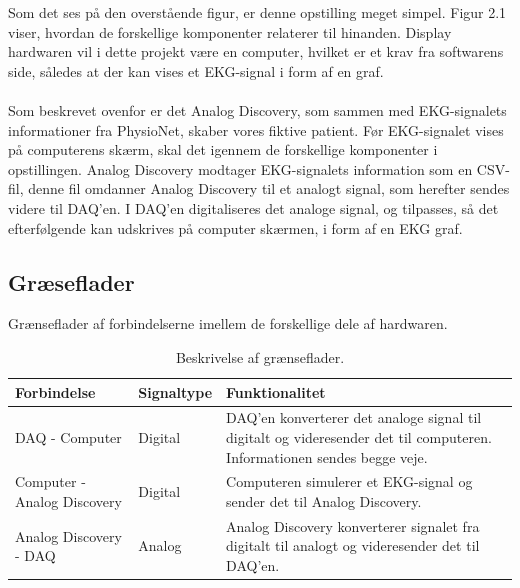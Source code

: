 Som det ses på den overstående figur, er denne opstilling meget simpel. Figur 2.1 viser, hvordan de forskellige komponenter relaterer til hinanden. Display hardwaren vil i dette projekt være en computer, hvilket er et krav fra softwarens side, således at der kan vises et EKG-signal i form af en graf.
\\
\\  
Som beskrevet ovenfor er det Analog Discovery, som sammen med EKG-signalets informationer fra PhysioNet, skaber vores fiktive patient. Før EKG-signalet vises på computerens skærm, skal det igennem de forskellige komponenter i opstillingen. Analog Discovery modtager EKG-signalets  information som en CSV-fil, denne fil omdanner Analog Discovery til et analogt signal, som herefter sendes videre til DAQ’en. I DAQ’en digitaliseres det analoge signal, og tilpasses, så det efterfølgende kan udskrives på computer skærmen, i form af en EKG graf. 

\subsection{Græseflader}
Grænseflader af forbindelserne imellem de forskellige dele af hardwaren. 

\begin{table}[H] 
	\begin{tabularx}{\textwidth}{l l X}
    \toprule
     \textbf{Forbindelse}   & \textbf{Signaltype} & \textbf{Funktionalitet}    \\ \midrule
     DAQ - Computer         & Digital & DAQ'en konverterer det analoge signal til digitalt og videresender det til 							  computeren. Informationen sendes begge veje. \\ 
     					      \addlinespace[2mm]                                                                                                                                                                            
     Computer - Analog Discovery			& Digital & Computeren simulerer et EKG-signal og sender det til Analog Discovery.\\ 
     				    	  \addlinespace[2mm]   				                                                                                                                                                                           
     Analog Discovery - DAQ			   	& Analog & Analog Discovery	 konverterer signalet fra digitalt til analogt og videresender det til 							      DAQ'en.\\  				      
    \bottomrule                                                                                                                   
    \end{tabularx}
    \caption {Beskrivelse af grænseflader.}
    \label{tab:graenseflader}
\end{table}



